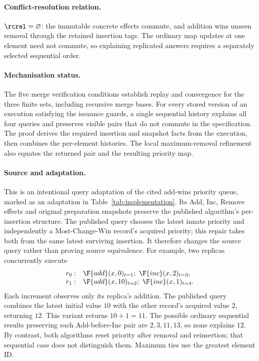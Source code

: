 \paragraph{Conflict-resolution relation.}
$\rcrel=\varnothing$: the immutable concrete effects commute, and addition
wins unseen removal through the retained insertion tags. The ordinary map
updates at one element need not commute, so explaining replicated answers
requires a separately selected sequential order.

\paragraph{Mechanisation status.}
The five merge verification conditions establish replay and convergence
for the three finite sets, including recursive merge bases. For every stored
version of an execution satisfying the issuance guards, a single sequential
history explains all four queries and preserves visible pairs that do not
commute in the specification. The proof derives the required insertion and
snapshot facts from the execution, then combines the per-element histories.
The local maximum-removal refinement also equates the returned pair and the
resulting priority map.

\paragraph{Source and adaptation.}
This is an intentional query adaptation of the cited add-wins priority queue,
marked as an adaptation in Table~\ref{tab:implementation}. Its Add, Inc,
Remove effects and original preparation snapshots preserve the published
algorithm's per-insertion structure. The published query chooses the latest
innate priority and independently a Most-Change-Win record's acquired priority;
this repair takes both from the same latest surviving insertion. It therefore
changes the source query rather than proving source equivalence. For example,
two replicas concurrently execute
\[
\begin{array}{ll}
r_0:&\F{add}(x,0)_{t=1};\ \F{inc}(x,2)_{t=3},\\
r_1:&\F{add}(x,10)_{t=2};\ \F{inc}(x,1)_{t=4}.
\end{array}
\]
Each increment observes only its replica's addition. The published query
combines the latest initial value $10$ with the other record's acquired
value $2$, returning $12$. This variant returns $10+1=11$. The possible
ordinary sequential results preserving each Add-before-Inc pair are
$2,3,11,13$, so none explains $12$. By contrast, both algorithms reset
priority after removal and reinsertion; that sequential case does not
distinguish them. Maximum ties use the greatest element ID.

